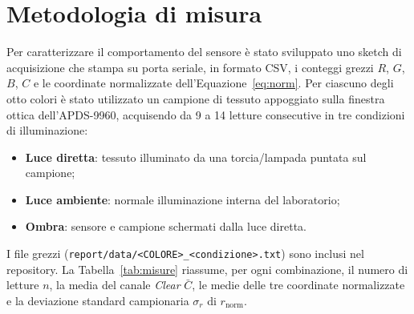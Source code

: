 \documentclass[11pt,a4paper,twoside,openany]{report}
\newcommand{\rn}{r_{\mathrm{norm}}}
\begin{document}
\section{Metodologia di misura}

Per caratterizzare il comportamento del sensore è stato sviluppato uno
sketch di acquisizione che stampa su porta seriale, in formato CSV, i
conteggi grezzi $R$, $G$, $B$, $C$ e le coordinate normalizzate
dell'Equazione~\eqref{eq:norm}. Per ciascuno degli otto colori è stato
utilizzato un campione di tessuto appoggiato sulla finestra ottica
dell'APDS-9960, acquisendo da 9 a 14 letture consecutive in tre
condizioni di illuminazione:

\begin{itemize}
  \item \textbf{Luce diretta}: tessuto illuminato da una torcia/lampada
        puntata sul campione;
  \item \textbf{Luce ambiente}: normale illuminazione interna del
        laboratorio;
  \item \textbf{Ombra}: sensore e campione schermati dalla luce
        diretta.
\end{itemize}

I file grezzi (\texttt{report/data/<COLORE>\_<condizione>.txt}) sono
inclusi nel repository. La Tabella~\ref{tab:misure} riassume, per ogni
combinazione, il numero di letture $n$, la media del canale
\textit{Clear} $\bar{C}$, le medie delle tre coordinate normalizzate e la
deviazione standard campionaria $\sigma_r$ di $\rn$.
\end{document}
